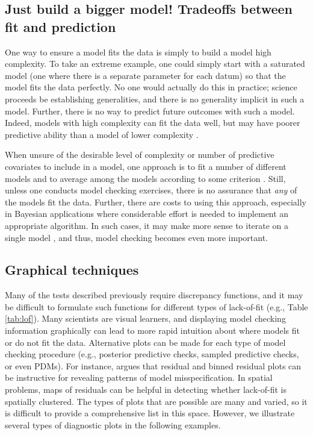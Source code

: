 \documentclass[12pt,english]{article}
\begin{document}
\begin{spacing}{1.9}
\subsection{Just build a bigger model!  Tradeoffs between fit and
  prediction}

One way to ensure a model fits the data is simply to build a model
high complexity.  To take an extreme example, one could simply start
with a saturated model (one where there is a separate parameter for
each datum) so that the model fits the data perfectly.  No one would
actually do this in practice; science proceeds be establishing
generalities, and there is no generality implicit in such a model.
Further, there is no way to predict future outcomes with such a model.
Indeed, models with high complexity can fit the data well, but may
have poorer predictive ability than a model of lower complexity
\citep{BurnhamAnderson2002,HootenHobbs2015}.

When unsure of the desirable level of complexity or number of
predictive covariates to include in a model, one approach is to fit a
number of different models and to average among the models according
to some criterion \citep[see,
e.g.,][]{Green1995,HoetingEtAl1999,LinkBarker2006}. Still, unless one
conducts model checking exercises, there is no assurance that
\textit{any} of the models fit the data.  Further, there are costs to
using this approach, especially in Bayesian applications where
considerable effort is needed to implement an appropriate algorithm.
In such cases, it may make more sense to iterate on a single model
\citep{VerHoefBoveng2015}, and thus, model checking becomes even more
important.

\subsection{Graphical techniques}

Many of the tests described previously require discrepancy functions,
and it may be difficult to formulate such functions for different
types of lack-of-fit (e.g., Table \ref{tab:lof}).  Many scientists are
visual learners, and displaying model checking information graphically
can lead to more rapid intuition about where models fit or do not fit
the data.  Alternative plots can be made for each type of model
checking procedure (e.g., posterior predictive checks, sampled
predictive checks, or even PDMs).  For instance,
\citet{GelmanEtAl2014} argues that residual and binned residual plots
can be instructive for revealing patterns of model misspecification.
In spatial problems, maps of residuals can be helpful in detecting
whether lack-of-fit is spatially clustered.  The types of plots that
are possible are many and varied, so it is difficult to provide a
comprehensive list in this space. However, we illustrate several types
of diagnostic plots in the following examples.


\end{spacing}
\end{document}
